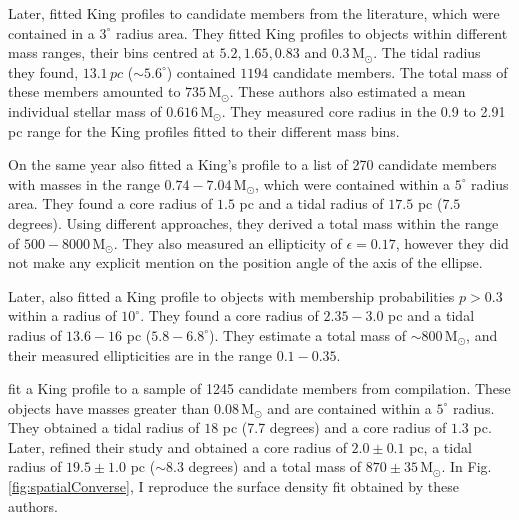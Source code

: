 \sloppy
Later, \citet{Pinfield1998} fitted King profiles \citep{King1962} to candidate members from the literature, which were contained in a $3^{\circ}$ radius area. They fitted King profiles to objects within different mass ranges, their bins centred at $5.2,1.65,0.83$ and $0.3 \,\mathrm{M_{\odot}}$. The tidal radius they found, $13.1\,pc$ ($\sim 5.6^{\circ}$) contained $1194$ candidate members. The total mass of these members amounted to $735\,\mathrm{M_{\odot}}$. These authors also estimated a mean individual stellar mass of $0.616\,\mathrm{M_{\odot}}$. {They measured core radius in the 0.9 to 2.91 pc range for the King profiles fitted to their different mass bins.}

On the same year \citet{Raboud1998} also fitted a King's profile \citep{King1962} to a list of 270 candidate members with masses in the range $0.74-7.04\,\mathrm{M_{\odot}}$, which were contained within a $5^{\circ}$ radius area. They found a core radius of $1.5$ pc and a tidal radius of $17.5$ pc ($7.5$ degrees). Using different approaches, they derived a total mass within the range of $500 -8000 \,\mathrm{M_{\odot}}$. They also measured an ellipticity of $\epsilon=0.17$, however they did not make any explicit mention on the position angle of the axis of the ellipse.

Later, \citet{Adams2001} also fitted a King profile to objects with membership probabilities $p>0.3$ within a radius of $10^{\circ}$. They found a core radius of $2.35-3.0$ pc and a tidal radius of $13.6-16$ pc ($5.8 - 6.8^{\circ}$). They estimate a total mass of $\sim 800\,\mathrm{M_{\odot}}$, and their measured ellipticities are in the range $0.1-0.35$. 

\citet{Converse2008} fit a King profile to a sample of 1245 candidate members from \citet{Stauffer2007} compilation. These objects have masses greater than $0.08\,\mathrm{M_{\odot}}$ and are contained within a $5^{\circ}$ radius. They obtained a tidal radius of $18$ pc (7.7 degrees) and a core radius of  $1.3$ pc. Later, \citet{Converse2010} refined their study and obtained a core radius of $2.0\pm0.1$ pc, a tidal radius of $19.5 \pm 1.0 $ pc ($\sim 8.3$ degrees) and a total mass of $870\pm35\,\mathrm{M_{\odot}}$. In Fig. \ref{fig:spatialConverse}, I reproduce the surface density fit obtained by these authors.

